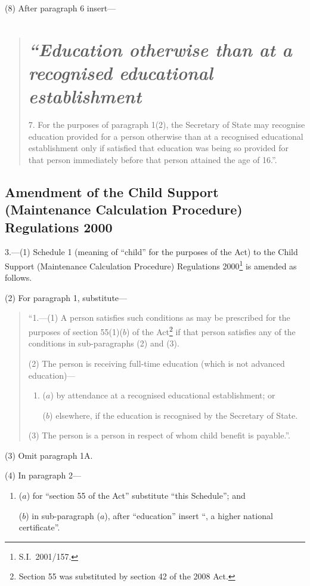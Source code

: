 \documentclass[12pt,a4paper]{article}
\begin{document}
(8) After paragraph 6 insert—
\begin{quotation}
\section*{\itshape “Education otherwise than at a recognised educational establishment}

7.  For the purposes of paragraph 1(2), the Secretary of State may recognise education provided for a person otherwise than at a recognised educational establishment only if satisfied that education was being so provided for that person immediately before that person attained the age of 16.”.
\end{quotation}

\subsection[3. Amendment of the Child Support (Maintenance Calculation Procedure) Regulations 2000]{Amendment of the Child Support (Maintenance Calculation Procedure) Regulations 2000}

3.---(1)  Schedule 1 (meaning of “child” for the purposes of the Act) to the Child Support (Maintenance Calculation Procedure) Regulations 2000\footnote{S.I.~2001/157.} is amended as follows.

(2) For paragraph 1, substitute—
\begin{quotation}
“1.---(1)   A person satisfies such conditions as may be prescribed for the purposes of section 55(1)($b$) of the Act\footnote{Section 55 was substituted by section 42 of the 2008 Act.} if that person satisfies any of the conditions in sub-paragraphs (2) and (3).

(2) The person is receiving full-time education (which is not advanced education)—
\begin{enumerate}\item[]
($a$) by attendance at a recognised educational establishment; or

($b$) elsewhere, if the education is recognised by the Secretary of State.
\end{enumerate}

(3) The person is a person in respect of whom child benefit is payable.”.
\end{quotation}

(3) Omit paragraph 1A.

(4) In paragraph 2—
\begin{enumerate}\item[]
($a$) for “section 55 of the Act” substitute “this Schedule”; and

($b$) in sub-paragraph ($a$), after “education” insert “, a higher national certificate”.
\end{enumerate}
\end{document}

